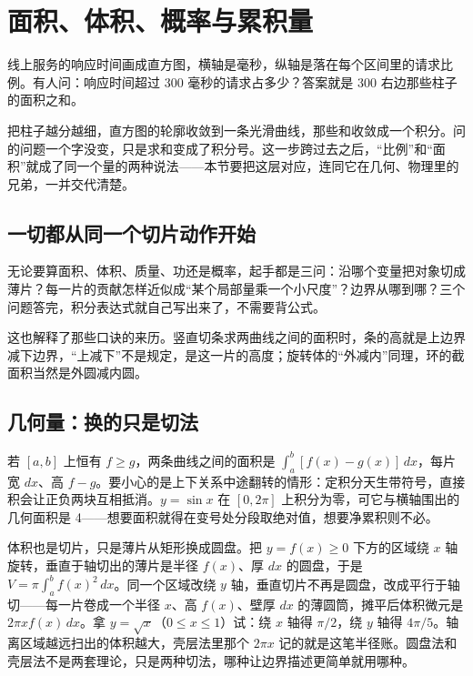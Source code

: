 \section{面积、体积、概率与累积量}
\label{sec:02-Calculus/04-Integration/05}

线上服务的响应时间画成直方图，横轴是毫秒，纵轴是落在每个区间里的请求比例。有人问：响应时间超过 300 毫秒的请求占多少？答案就是 300 右边那些柱子的面积之和。

把柱子越分越细，直方图的轮廓收敛到一条光滑曲线，那些和收敛成一个积分。问的问题一个字没变，只是求和变成了积分号。这一步跨过去之后，``比例''和``面积''就成了同一个量的两种说法——本节要把这层对应，连同它在几何、物理里的兄弟，一并交代清楚。

\subsection{一切都从同一个切片动作开始}

无论要算面积、体积、质量、功还是概率，起手都是三问：沿哪个变量把对象切成薄片？每一片的贡献怎样近似成``某个局部量乘一个小尺度''？边界从哪到哪？三个问题答完，积分表达式就自己写出来了，不需要背公式。

这也解释了那些口诀的来历。竖直切条求两曲线之间的面积时，条的高就是上边界减下边界，``上减下''不是规定，是这一片的高度；旋转体的``外减内''同理，环的截面积当然是外圆减内圆。

\subsection{几何量：换的只是切法}

若 \([a,b]\) 上恒有 \(f\ge g\)，两条曲线之间的面积是 \(\int_a^b[f(x)-g(x)]\,dx\)，每片宽 \(dx\)、高 \(f-g\)。要小心的是上下关系中途翻转的情形：定积分天生带符号，直接积会让正负两块互相抵消。\(y=\sin x\) 在 \([0,2\pi]\) 上积分为零，可它与横轴围出的几何面积是 4——想要面积就得在变号处分段取绝对值，想要净累积则不必。

体积也是切片，只是薄片从矩形换成圆盘。把 \(y=f(x)\ge0\) 下方的区域绕 \(x\) 轴旋转，垂直于轴切出的薄片是半径 \(f(x)\)、厚 \(dx\) 的圆盘，于是 \(V=\pi\int_a^b f(x)^2\,dx\)。同一个区域改绕 \(y\) 轴，垂直切片不再是圆盘，改成平行于轴切——每一片卷成一个半径 \(x\)、高 \(f(x)\)、壁厚 \(dx\) 的薄圆筒，摊平后体积微元是 \(2\pi x f(x)\,dx\)。拿 \(y=\sqrt x\)（\(0\le x\le1\)）试：绕 \(x\) 轴得 \(\pi/2\)，绕 \(y\) 轴得 \(4\pi/5\)。轴离区域越远扫出的体积越大，壳层法里那个 \(2\pi x\) 记的就是这笔半径账。圆盘法和壳层法不是两套理论，只是两种切法，哪种让边界描述更简单就用哪种。

